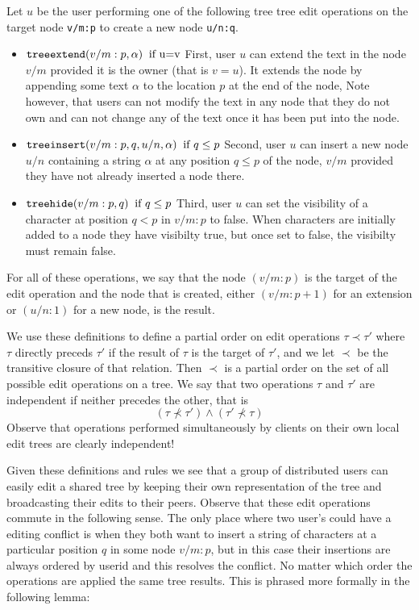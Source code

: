 \documentclass{amsart}
\begin{document}
Let $u$ be the user performing one of the following tree tree edit operations
on the target node {\tt v/m:p} to create a new node {\tt u/n:q}.
\begin{itemize}
\item ${\tt treeextend}(v/m:p,\alpha)\;\;\text{if u=v}$ \newline
First, user $u$ can extend the text in the node $v/m$
provided it is the owner (that is $v=u$). It extends the node by appending
some text $\alpha$ to the location $p$ at the end of the node,
Note however, that users can not modify
the text in any node that they do not own and can not change any of the text
once it has been put into the node.
\item ${\tt treeinsert}(v/m:p,q,u/n,\alpha) \;\; \text{if $q\le p$}$
\newline
Second, user $u$ can insert a new node $u/n$ containing a string $\alpha$
at any position $q\le p$ of the node, 
$v/m$ provided
they have not already inserted a node there.
\item ${\tt treehide}(v/m:p,q)  \;\; \text{if $q\le p$}$\newline
Third, user $u$ can set the visibility of a character at position $q < p$
in  $v/m:p$ to false.
When characters are initially added to a node they have visibilty true, but once
set to false, the visibilty must remain false. 
\end{itemize}
For all of these operations, we say that the node $(v/m:p)$ is the target of the edit operation and the node that is created, either $(v/m:p+1)$ for an extension or $(u/n:1)$ for a new node, is the result.  

We use these definitions to define a partial order on edit operations $\tau\prec\tau'$ where $\tau$ directly preceds $\tau'$ if the result of $\tau$ is the target of $\tau'$, and we let $\prec$ be the transitive closure of that relation.  Then $\prec$ is a partial order on the set of all possible edit operations on a tree. We say that two operations $\tau$ and $\tau'$ are independent if neither precedes the other, that is 
\[
\left (\tau\not\prec\tau'\right ) \wedge  \left ( \tau'\not\prec\tau \right )
\]
Observe that operations performed simultaneously by clients on their own local edit trees are clearly independent!

Given these definitions and rules we see that a group of distributed users can easily edit a 
shared tree by keeping their own representation of the tree and broadcasting
their edits to their peers. Observe that these edit operations commute in
the following sense. The only place where two user's could have a editing
conflict is when they both want to insert a string of characters at a particular
position $q$ in some node $v/m:p$, but in this case their insertions are always
ordered by userid and this resolves the conflict. No matter which order the
operations are applied the same tree results. This is phrased more formally
in the following lemma:
\end{document}
